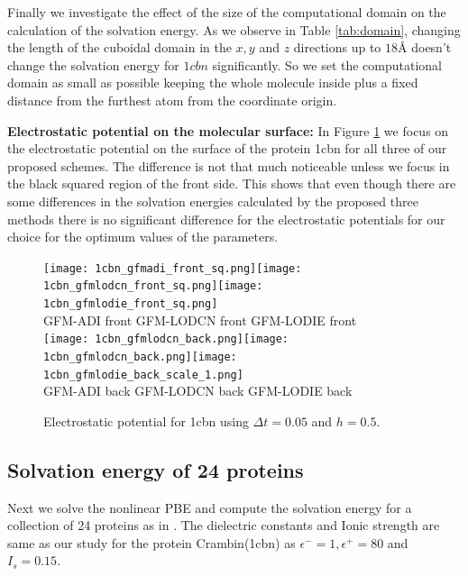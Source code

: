 Finally we investigate the effect of the size of the computational domain on the calculation of the solvation energy. As we observe in Table \ref{tab:domain}, changing the length of the cuboidal domain in the $x,y$ and $z$ directions up to $18$\r{A} doesn't change the solvation energy for $1cbn$ significantly. So we set the computational domain as small as possible keeping the whole molecule inside plus a fixed distance from the furthest atom from the coordinate origin.   


{\bf Electrostatic potential on the molecular surface:} In Figure \ref{fig_1cbn} we focus on the electrostatic potential on the surface of the protein 1cbn for all three of our proposed schemes. The difference is not that much noticeable unless we focus in the black squared region of the front side. This shows that even though there are some differences in the solvation energies calculated by the proposed three methods there is no significant difference for the electrostatic potentials for our choice for the optimum values of the parameters.    

\begin{figure}[!t]
\begin{center}	
	\texttt{[image: 1cbn\_gfmadi\_front\_sq.png]}\texttt{[image: 1cbn\_gfmlodcn\_front\_sq.png]}\texttt{[image: 1cbn\_gfmlodie\_front\_sq.png]}\\
GFM-ADI front \hskip 0.7in GFM-LODCN front \hskip 0.7in GFM-LODIE front\\
	\texttt{[image: 1cbn\_gfmlodcn\_back.png]}\texttt{[image: 1cbn\_gfmlodcn\_back.png]}\texttt{[image: 1cbn\_gfmlodie\_back\_scale\_1.png]}\\
  GFM-ADI back \hskip 0.7in GFM-LODCN back \hskip 0.7in GFM-LODIE back\\
	\caption{Electrostatic potential for 1cbn using $\Delta t = 0.05$ and $h= 0.5$. }
\label{fig_1cbn}
\end{center}
\end{figure}



\subsection{Solvation energy of 24 proteins}
Next we solve the nonlinear PBE and compute the solvation energy for a collection of 24 proteins as in \cite{Geng2007,Geng2017a}. The dielectric constants and Ionic strength are same as our study for the protein Crambin(1cbn) as $\epsilon^-=1, \epsilon^+=80$ and $I_s = 0.15$.
 

